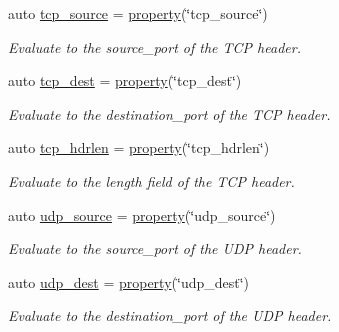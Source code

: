 \begin{DoxyCompactItemize}
auto \hyperlink{namespacepfq_1_1lang_1_1anonymous__namespace_02default_8hpp_03_a367a9ec6d91677553073c54a059b391d}{tcp\+\_\+source} = \hyperlink{namespacepfq_1_1lang_a1249450e72229273b0db707a286aea91}{property}(\char`\"{}tcp\+\_\+source\char`\"{})
\begin{DoxyCompactList}\small\item\em Evaluate to the {\ttfamily source\+\_\+port} of the T\+CP header. \end{DoxyCompactList}\item 
auto \hyperlink{namespacepfq_1_1lang_1_1anonymous__namespace_02default_8hpp_03_a83741c074712431d2e75f09744bb7486}{tcp\+\_\+dest} = \hyperlink{namespacepfq_1_1lang_a1249450e72229273b0db707a286aea91}{property}(\char`\"{}tcp\+\_\+dest\char`\"{})
\begin{DoxyCompactList}\small\item\em Evaluate to the {\ttfamily destination\+\_\+port} of the T\+CP header. \end{DoxyCompactList}\item 
auto \hyperlink{namespacepfq_1_1lang_1_1anonymous__namespace_02default_8hpp_03_a678163384b58e4682bdbaf7efdd22cfb}{tcp\+\_\+hdrlen} = \hyperlink{namespacepfq_1_1lang_a1249450e72229273b0db707a286aea91}{property}(\char`\"{}tcp\+\_\+hdrlen\char`\"{})
\begin{DoxyCompactList}\small\item\em Evaluate to the {\ttfamily length} field of the T\+CP header. \end{DoxyCompactList}\item 
auto \hyperlink{namespacepfq_1_1lang_1_1anonymous__namespace_02default_8hpp_03_ab44590359ef60febe9bfc6465bcf932a}{udp\+\_\+source} = \hyperlink{namespacepfq_1_1lang_a1249450e72229273b0db707a286aea91}{property}(\char`\"{}udp\+\_\+source\char`\"{})
\begin{DoxyCompactList}\small\item\em Evaluate to the {\ttfamily source\+\_\+port} of the U\+DP header. \end{DoxyCompactList}\item 
auto \hyperlink{namespacepfq_1_1lang_1_1anonymous__namespace_02default_8hpp_03_a7c15d9ec0af24b9515acc8a04b7b1e2e}{udp\+\_\+dest} = \hyperlink{namespacepfq_1_1lang_a1249450e72229273b0db707a286aea91}{property}(\char`\"{}udp\+\_\+dest\char`\"{})
\begin{DoxyCompactList}\small\item\em Evaluate to the {\ttfamily destination\+\_\+port} of the U\+DP header. \end{DoxyCompactList}\item 

\end{DoxyCompactItemize}
